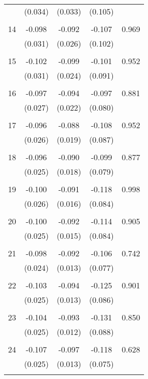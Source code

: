 \begin{tabular}{l*{1}{cccc}}
          & (0.034) & (0.033) & (0.105) & \\
 & & & &\\
  14       & -0.098 & -0.092 & -0.107 & 0.969 \\
          & (0.031) & (0.026) & (0.102) & \\
 & & & &\\
  15       & -0.102 & -0.099 & -0.101 & 0.952 \\
          & (0.031) & (0.024) & (0.091) & \\
 & & & &\\
  16       & -0.097 & -0.094 & -0.097 & 0.881 \\
          & (0.027) & (0.022) & (0.080) & \\
 & & & &\\
  17       & -0.096 & -0.088 & -0.108 & 0.952 \\
          & (0.026) & (0.019) & (0.087) & \\
 & & & &\\
  18       & -0.096 & -0.090 & -0.099 & 0.877 \\
          & (0.025) & (0.018) & (0.079) & \\
 & & & &\\
  19       & -0.100 & -0.091 & -0.118 & 0.998 \\
          & (0.026) & (0.016) & (0.084) & \\
 & & & &\\
  20       & -0.100 & -0.092 & -0.114 & 0.905 \\
          & (0.025) & (0.015) & (0.084) & \\
 & & & &\\
  21       & -0.098 & -0.092 & -0.106 & 0.742 \\
          & (0.024) & (0.013) & (0.077) & \\
 & & & &\\
  22       & -0.103 & -0.094 & -0.125 & 0.901 \\
          & (0.025) & (0.013) & (0.086) & \\
 & & & &\\
  23       & -0.104 & -0.093 & -0.131 & 0.850 \\
          & (0.025) & (0.012) & (0.088) & \\
 & & & &\\
  24       & -0.107 & -0.097 & -0.118 & 0.628 \\
          & (0.025) & (0.013) & (0.075) & \\
 & & & &\\

\end{tabular}
